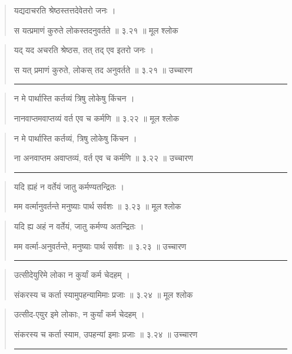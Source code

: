 \begin{quotation}

यद्यदाचरति श्रेष्ठस्तत्तदेवेतरो जनः  ।  

स यत्प्रमाणं कुरुते लोकस्तदनुवर्तते  ॥ ३.२१ ॥  मूल श्लोक
\end{quotation}

\begin{quotation}

यद् यद अचरति श्रेष्ठस, तत् तद् एव इतरो जनः  ।  

स यत् प्रमाणं कुरुते, लोकस् तद अनुवर्तते  ॥ ३.२१ ॥  उच्चारण

\noindent\rule{16cm}{0.4pt} 
\end{quotation}


\begin{quotation}

न मे पार्थास्ति कर्तव्यं त्रिषु लोकेषु किंचन  ।  

नानवाप्तमवाप्तव्यं वर्त एव च कर्मणि  ॥ ३.२२ ॥  मूल श्लोक
\end{quotation}

\begin{quotation}

न मे पार्थास्ति कर्तव्यं, त्रिषु लोकेषु किंचन  ।  

ना अनवाप्तम अवाप्तव्यं, वर्त एव च कर्मणि  ॥ ३.२२ ॥  उच्चारण

\noindent\rule{16cm}{0.4pt} 
\end{quotation}


\begin{quotation}

यदि ह्यहं न वर्तेयं जातु कर्मण्यतन्द्रितः  ।  

मम वर्त्मानुवर्तन्ते मनुष्याः पार्थ सर्वशः  ॥ ३.२३ ॥  मूल श्लोक
\end{quotation}

\begin{quotation}
यदि ह्य अहं न वर्तेयं, जातु कर्मण्य अतन्द्रितः  ।  

मम वर्त्मा-अनुवर्तन्ते, मनुष्याः पार्थ सर्वशः  ॥ ३.२३ ॥  उच्चारण

\noindent\rule{16cm}{0.4pt} 
\end{quotation}


\begin{quotation}

उत्सीदेयुरिमे लोका न कुर्यां कर्म चेदहम्‌  ।  

संकरस्य च कर्ता स्यामुपहन्यामिमाः प्रजाः  ॥ ३.२४ ॥  मूल श्लोक
\end{quotation}

\begin{quotation}

उत्सीद-एयुर इमे लोकाः, न कुर्यां कर्म चेदहम्‌  ।  

संकरस्य च कर्ता स्याम, उपहन्यां इमाः प्रजाः  ॥ ३.२४ ॥  उच्चारण

\noindent\rule{16cm}{0.4pt} 
\end{quotation}


